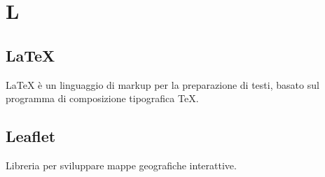 \section*{L}
\markright{}
\subsection*{\LaTeX{}}
\LaTeX{} è un linguaggio di markup per la preparazione di testi, basato sul programma di composizione tipografica \TeX{}.
\subsection*{Leaflet}
Libreria  per sviluppare mappe geografiche interattive.